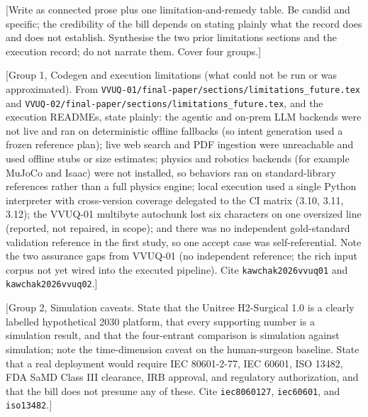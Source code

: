 
[Write as connected prose plus one limitation-and-remedy table. Be candid and
specific; the credibility of the bill depends on stating plainly what the record
does and does not establish. Synthesise the two prior limitations sections and the
execution record; do not narrate them. Cover four groups.]

[Group 1, Codegen and execution limitations (what could not be run or was
approximated). From \texttt{VVUQ-01/final-paper/sections/limitations\_future.tex}
and \texttt{VVUQ-02/final-paper/sections/limitations\_future.tex}, and the
execution READMEs, state plainly: the agentic and on-prem LLM backends were not
live and ran on deterministic offline fallbacks (so intent generation used a
frozen reference plan); live web search and PDF ingestion were unreachable and
used offline stubs or size estimates; physics and robotics backends (for example
MuJoCo and Isaac) were not installed, so behaviors ran on standard-library
references rather than a full physics engine; local execution used a single Python
interpreter with cross-version coverage delegated to the CI matrix (3.10, 3.11,
3.12); the VVUQ-01 multibyte autochunk lost six characters on one oversized line
(reported, not repaired, in scope); and there was no independent gold-standard
validation reference in the first study, so one accept case was self-referential.
Note the two assurance gaps from VVUQ-01 (no independent reference; the rich input
corpus not yet wired into the executed pipeline). Cite \texttt{kawchak2026vvuq01}
and \texttt{kawchak2026vvuq02}.]

[Group 2, Simulation caveats. State that the Unitree H2-Surgical 1.0 is a clearly
labelled hypothetical 2030 platform, that every supporting number is a simulation
result, and that the four-entrant comparison is simulation against simulation;
note the time-dimension caveat on the human-surgeon baseline. State that a real
deployment would require IEC 80601-2-77, IEC 60601, ISO 13482, FDA SaMD Class III
clearance, IRB approval, and regulatory authorization, and that the bill does not
presume any of these. Cite \texttt{iec8060127}, \texttt{iec60601}, and
\texttt{iso13482}.]

